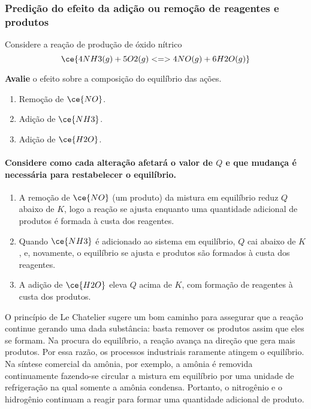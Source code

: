 \begin{example}

\subsubsection{Predição do efeito da adição ou remoção de reagentes e produtos}

Considere a reação de produção de óxido nítrico \[
    \ce{ 4 NH3(g) + 5 O2(g) <=> 4 NO(g) + 6 H2O(g) }
\]

\textbf{Avalie} o efeito sobre a composição do equilíbrio das ações.

\begin{enumerate}
\def\labelenumi{\alph{enumi}.}
\tightlist
\item
  Remoção de \(\ce{NO}\).
\item
  Adição de \(\ce{NH3}\).
\item
  Adição de \(\ce{H2O}\).
\end{enumerate}

\paragraph{\texorpdfstring{Considere como cada alteração afetará o valor de \(Q\) e que mudança é necessária para restabelecer o
equilíbrio.}{Considere como cada alteração afetará o valor de Q e que mudança é necessária para restabelecer o equilíbrio.}}

\begin{enumerate}
\def\labelenumi{\alph{enumi}.}
\tightlist
\item
  A remoção de \(\ce{NO}\) (um produto) da mistura em equilíbrio reduz \(Q\) abaixo de \(K\), logo a reação se ajusta enquanto uma quantidade
  adicional de produtos é formada à custa dos reagentes.
\item
  Quando \(\ce{NH3}\) é adicionado ao sistema em equilíbrio, \(Q\) cai abaixo de \(K\), e, novamente, o equilíbrio se ajusta e produtos são formados à
  custa dos reagentes.
\item
  A adição de \(\ce{H2O}\) eleva \(Q\) acima de \(K\), com formação de reagentes à custa dos produtos.
\end{enumerate}

\end{example}

O princípio de Le Chatelier sugere um bom caminho para assegurar que a reação continue gerando uma dada substância: basta remover os produtos assim
que eles se formam. Na procura do equilíbrio, a reação avança na direção que gera mais produtos. Por essa razão, os processos industriais raramente
atingem o equilíbrio. Na síntese comercial da amônia, por exemplo, a amônia é removida continuamente fazendo-se circular a mistura em equilíbrio por
uma unidade de refrigeração na qual somente a amônia condensa. Portanto, o nitrogênio e o hidrogênio continuam a reagir para formar uma quantidade
adicional de produto.

